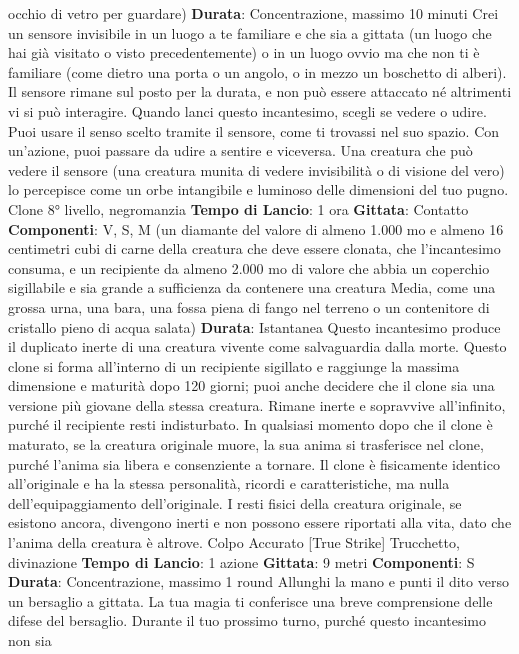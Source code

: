 \begin{multicols}{2}
occhio di vetro per guardare)
\textbf{Durata}: Concentrazione, massimo 10 minuti
Crei un sensore invisibile in un luogo a te familiare e
che sia a gittata (un luogo che hai già visitato o visto
precedentemente) o in un luogo ovvio ma che non ti è
familiare (come dietro una porta o un angolo, o in
mezzo un boschetto di alberi). Il sensore rimane sul
posto per la durata, e non può essere attaccato né
altrimenti vi si può interagire.
Quando lanci questo incantesimo, scegli se vedere o
udire. Puoi usare il senso scelto tramite il sensore,
come ti trovassi nel suo spazio. Con un’azione, puoi
passare da udire a sentire e viceversa.
Una creatura che può vedere il sensore (una creatura
munita di vedere invisibilità o di visione del vero) lo
percepisce come un orbe intangibile e luminoso delle
dimensioni del tuo pugno.
Clone
8° livello, negromanzia
\textbf{Tempo di Lancio}: 1 ora
\textbf{Gittata}: Contatto
\textbf{Componenti}: V, S, M (un diamante del valore di
almeno 1.000 mo e almeno 16 centimetri cubi di carne
della creatura che deve essere clonata, che
l’incantesimo consuma, e un recipiente da almeno
2.000 mo di valore che abbia un coperchio sigillabile e
sia grande a sufficienza da contenere una creatura
Media, come una grossa urna, una bara, una fossa
piena di fango nel terreno o un contenitore di cristallo
pieno di acqua salata)
\textbf{Durata}: Istantanea
Questo incantesimo produce il duplicato inerte di una
creatura vivente come salvaguardia dalla morte. Questo
clone si forma all’interno di un recipiente sigillato e
raggiunge la massima dimensione e maturità dopo 120
giorni; puoi anche decidere che il clone sia una
versione più giovane della stessa creatura. Rimane
inerte e sopravvive all’infinito, purché il recipiente resti
indisturbato.
In qualsiasi momento dopo che il clone è maturato, se
la creatura originale muore, la sua anima si trasferisce
nel clone, purché l’anima sia libera e consenziente a
tornare. Il clone è fisicamente identico all’originale e ha
la stessa personalità, ricordi e caratteristiche, ma nulla
dell’equipaggiamento dell’originale. I resti fisici della
creatura originale, se esistono ancora, divengono inerti
e non possono essere riportati alla vita, dato che
l’anima della creatura è altrove.
Colpo Accurato
[True Strike]
Trucchetto, divinazione
\textbf{Tempo di Lancio}: 1 azione
\textbf{Gittata}: 9 metri
\textbf{Componenti}: S
\textbf{Durata}: Concentrazione, massimo 1 round
Allunghi la mano e punti il dito verso un bersaglio a
gittata. La tua magia ti conferisce una breve
comprensione delle difese del bersaglio. Durante il tuo
prossimo turno, purché questo incantesimo non sia

\end{multicols}
